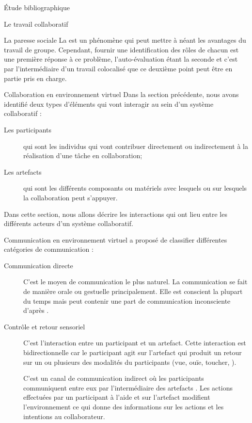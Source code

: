 \documentclass[myfrancais,ngerman,english,frenchb]{mythesis}
\begin{document}
\begin{mychapter}{Étude bibliographique}
\begin{mysection}{Le travail collaboratif}
\begin{mysubsection}{La paresse sociale}
				La  est un phénomène qui peut mettre à néant les avantages du travail de groupe.
				Cependant, fournir une identification des rôles de chacun est une première réponse à ce problème, l'auto-évaluation étant la seconde et c'est par l'intermédiaire d'un travail colocalisé que ce deuxième point peut être en partie pris en charge.
			\end{mysubsection}
		\end{mysection}
		\begin{mysection}{Collaboration en environnement virtuel}
			Dans la section précédente, nous avons identifié deux types d'éléments qui vont interagir au sein d'un système collaboratif :
			\begin{description}
				\item[Les participants] qui sont les individus qui vont contribuer directement ou indirectement à la réalisation d'une tâche en collaboration;
				\item[Les artefacts] qui sont les différents composants ou matériels avec lesquels ou sur lesquels la collaboration peut s'appuyer.
			\end{description}
			Dans cette section, nous allons décrire les interactions qui ont lieu entre les différents acteurs d'un système collaboratif.
			\begin{mysubsection}{Communication en environnement virtuel}
				 a proposé de classifier différentes catégories de communication :
				\begin{description}
					\item[Communication directe] C'est le moyen de communication le plus naturel.
						La communication se fait de manière orale ou gestuelle principalement.
						Elle est conscient la plupart du temps mais peut contenir une part de communication inconsciente d'après .
					\item[Contrôle et retour sensoriel] C'est l'interaction entre un participant et un artefact.
						Cette interaction est bidirectionnelle car le participant agit sur l'artefact qui produit un retour sur un ou plusieurs des modalités du participants (vue, ouïe, toucher, \myetc).
					\item[] C'est un canal de communication indirect où les participants communiquent entre eux par l'intermédiaire des artefacts .
						Les actions effectuées par un participant à l'aide et sur l'artefact modifient l'environnement ce qui donne des informations sur les actions et les intentions au collaborateur.

\end{description}
\end{mysubsection}
\end{mysection}
\end{mychapter}
\end{document}
